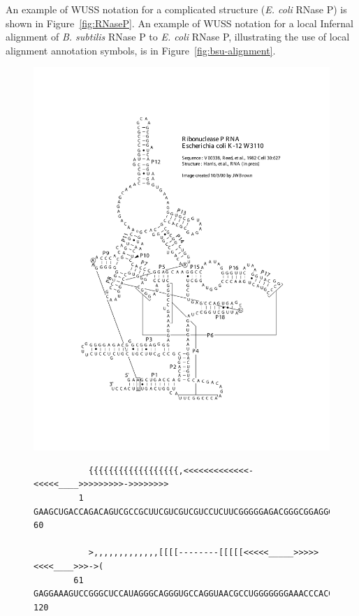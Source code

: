 An example of WUSS notation for a complicated structure
(\emph{E. coli} RNase P) is shown in Figure~\ref{fig:RNaseP}.  An
example of WUSS notation for a local Infernal alignment of
\emph{B. subtilis} RNase P to \emph{E. coli} RNase P, illustrating the
use of local alignment annotation symbols, is in
Figure~\ref{fig:bsu-alignment}.

\begin{figure}[tp]
\begin{center}
\includegraphics[scale=0.6]{Figures/rnaseP-ecoli}
\end{center}        
\begin{center}
{\scriptsize
\begin{BVerbatim}
           {{{{{{{{{{{{{{{{{{,<<<<<<<<<<<<<-<<<<<____>>>>>>>>>->>>>>>>>
         1 GAAGCUGACCAGACAGUCGCCGCUUCGUCGUCGUCCUCUUCGGGGGAGACGGGCGGAGGG 60      

           >,,,,,,,,,,,,,[[[[--------[[[[[<<<<<_____>>>>><<<<____>>>->(
        61 GAGGAAAGUCCGGGCUCCAUAGGGCAGGGUGCCAGGUAACGCCUGGGGGGGAAACCCACG 120     


\end{BVerbatim}}
\end{center}
\end{figure}
